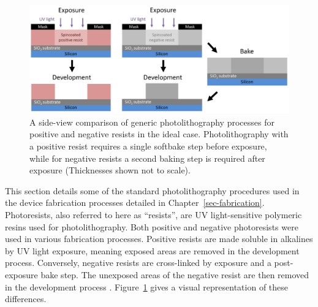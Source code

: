 \documentclass[
  a4paper,
]{scrbook}
\begin{document}
\begin{figure}

{\centering \includegraphics{./figures/app1/positive-negative-photolithography.png}

}

\caption{\label{fig-photolithography-types}A side-view comparison of
generic photolithography processes for positive and negative resists in
the ideal case. Photolithography with a positive resist requires a
single softbake step before exposure, while for negative resists a
second baking step is required after exposure (Thicknesses shown not to
scale).}

\end{figure}

This section details some of the standard photolithography procedures
used in the device fabrication processes detailed in
Chapter~\ref{sec-fabrication}. Photoresists, also referred to here as
``resists'', are UV light-sensitive polymeric resins used for
photolithography. Both positive and negative photoresists were used in
various fabrication processes. Positive resists are made soluble in
alkalines by UV light exposure, meaning exposed areas are removed in the
development process. Conversely, negative resists are cross-linked by
exposure and a post-exposure bake step. The unexposed areas of the
negative resist are then removed in the development process
\autocite{Microchemicals}. Figure~\ref{fig-photolithography-types} gives
a visual representation of these differences.
\end{document}
